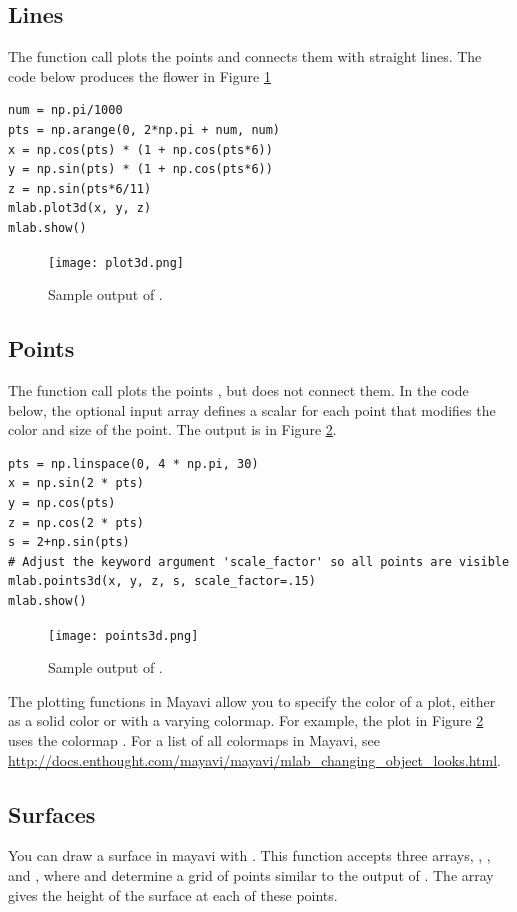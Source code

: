 \subsection*{Lines}
The function call  plots the points  and connects them with straight lines.
The code below produces the flower in Figure \ref{fig:plot3d}

\begin{lstlisting}
num = np.pi/1000
pts = np.arange(0, 2*np.pi + num, num)
x = np.cos(pts) * (1 + np.cos(pts*6))
y = np.sin(pts) * (1 + np.cos(pts*6))
z = np.sin(pts*6/11)
mlab.plot3d(x, y, z)
mlab.show()
\end{lstlisting}

\begin{figure}
\texttt{[image: plot3d.png]}
\caption{Sample output of .}
\label{fig:plot3d}
\end{figure}


\subsection*{Points}
The function call  plots the points , but does not connect them. 
In the code below, the optional input array  defines a scalar for each point that modifies the color and size of the point.
The output is in Figure \ref{fig:points3d}.

\begin{lstlisting}
pts = np.linspace(0, 4 * np.pi, 30)
x = np.sin(2 * pts)
y = np.cos(pts)
z = np.cos(2 * pts)
s = 2+np.sin(pts)
# Adjust the keyword argument 'scale_factor' so all points are visible
mlab.points3d(x, y, z, s, scale_factor=.15)
mlab.show()
\end{lstlisting}

\begin{figure}
\texttt{[image: points3d.png]}
\caption{Sample output of .}
\label{fig:points3d}
\end{figure}

The plotting functions in Mayavi allow you to specify the color of a plot, either as a solid color or with a varying colormap.
For example, the plot in Figure \ref{fig:points3d} uses the colormap \li{}.%
For a list of all colormaps in Mayavi, see \url{http://docs.enthought.com/mayavi/mayavi/mlab_changing_object_looks.html}.

\subsection*{Surfaces}
You can draw a surface in mayavi with .
This function accepts three arrays, , , and , where  and  determine a grid of points similar to the output of .
The array  gives the height of the surface at each of these points.

